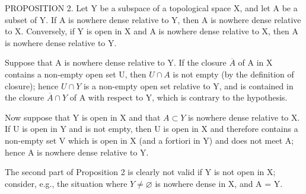 PROPOSITION 2. Let Y be a subspace of a topological space X, and let A be a subset of Y. If A is nowhere dense relative to Y, then A is nowhere dense relative to X. Conversely, if Y is open in X and A is nowhere dense relative to X, then A is nowhere dense relative to Y.

Suppose that A is nowhere dense relative to Y. If the closure \(\overline{A}\) of A in X contains a non-empty open set U, then \(U \cap A\) is not empty (by the definition of closure); hence \(U \cap Y\) is a non-empty open set relative to Y, and is contained in the closure \(\overline{A} \cap Y\) of A with respect to Y, which is contrary to the hypothesis.

Now suppose that Y is open in X and that \(A \subset Y\) is nowhere dense relative to X. If U is open in Y and is not empty, then U is open in X and therefore contains a non-empty set V which is open in X (and a fortiori in Y) and does not meet A; hence A is nowhere dense relative to Y.

The second part of Proposition 2 is clearly not valid if Y is not open in X; consider, e.g., the situation where \(Y \neq \varnothing\) is nowhere dense in X, and A = Y.

